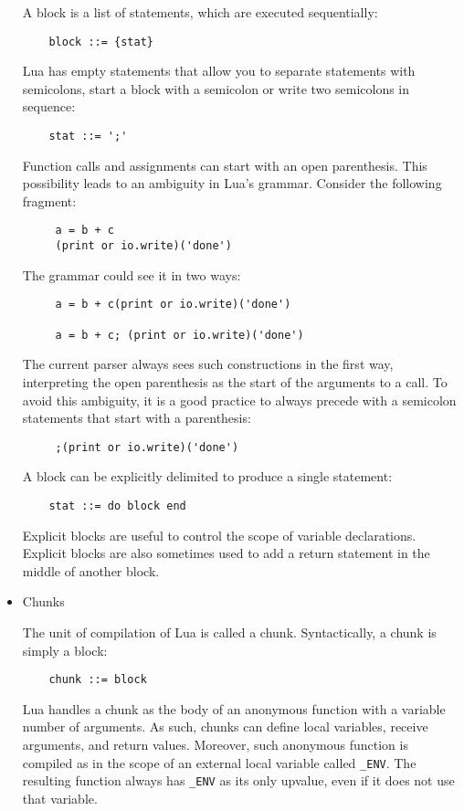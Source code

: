 \begin{itemize}
A block is a list of statements, which are executed sequentially:
\begin{lstlisting}
	block ::= {stat}
\end{lstlisting}
Lua has empty statements that allow you to separate statements with semicolons, start a block with a semicolon or write two semicolons in sequence:
\begin{lstlisting}
	stat ::= ';'
\end{lstlisting}
Function calls and assignments can start with an open parenthesis. This possibility leads to an ambiguity in Lua's grammar. Consider the following fragment:
\begin{lstlisting}
     a = b + c
     (print or io.write)('done')
\end{lstlisting}

The grammar could see it in two ways:
\begin{lstlisting}
     a = b + c(print or io.write)('done')
     
     a = b + c; (print or io.write)('done')
\end{lstlisting}
The current parser always sees such constructions in the first way, interpreting the open parenthesis as the start of the arguments to a call. To avoid this ambiguity, it is a good practice to always precede with a semicolon statements that start with a parenthesis:
\begin{lstlisting}
     ;(print or io.write)('done')
\end{lstlisting}

A block can be explicitly delimited to produce a single statement:
\begin{lstlisting}
	stat ::= do block end
\end{lstlisting}
Explicit blocks are useful to control the scope of variable declarations. Explicit blocks are also sometimes used to add a return statement in the middle of another block.

\item Chunks

The unit of compilation of Lua is called a chunk. Syntactically, a chunk is simply a block:
\begin{lstlisting}
	chunk ::= block
\end{lstlisting}

Lua handles a chunk as the body of an anonymous function with a variable number of arguments. As such, chunks can define local variables, receive arguments, and return values. Moreover, such anonymous function is compiled as in the scope of an external local variable called \verb=_ENV=. The resulting function always has \verb=_ENV= as its only upvalue, even if it does not use that variable.


\end{itemize}
